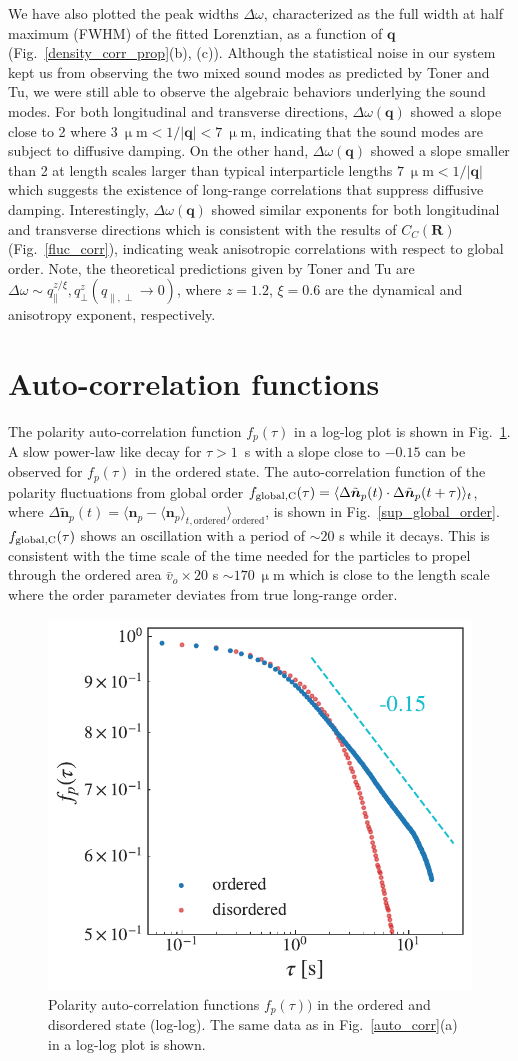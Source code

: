 \documentclass[%
 reprint,
 amsmath,amssymb,
 aps,
 floatfix
]{revtex4-2}
\begin{document}
We have also plotted the peak widths $\Delta\omega$, characterized as the full width at half maximum (FWHM) of the fitted Lorenztian, as a function of $\bm{q}$ (Fig.~\ref{density_corr_prop}(b), (c)).
Although the statistical noise in our system kept us from observing the two mixed sound modes as predicted by Toner and Tu, we were still able to observe the algebraic behaviors underlying the sound modes.
For both longitudinal and transverse directions, $\Delta\omega(\bm{q})$ showed a slope close to 2 where $3~\upmu\textrm{m}< 1/|\bm{q}| <7~\upmu\textrm{m}$, indicating that the sound modes are subject to diffusive damping.
On the other hand, $\Delta\omega(\bm{q})$ showed a slope smaller than 2 at length scales larger than typical interparticle lengths $7~\upmu\textrm{m}< 1/|\bm{q}|$ which suggests the existence of long-range correlations that suppress diffusive damping.
Interestingly, $\Delta\omega(\bm{q})$ showed similar exponents for both longitudinal and transverse directions which is consistent with the results of $C_C\left(\bm{R}\right)$ (Fig.~\ref{fluc_corr}), indicating weak anisotropic correlations with respect to global order.
Note, the theoretical predictions given by Toner and Tu are $\Delta\omega\sim q_{\parallel}^{z/\xi}, q_{\perp}^{z} (q_{\parallel,\perp}\rightarrow0)$, where $z=1.2$, $\xi=0.6$ are the dynamical and anisotropy exponent, respectively.


\section{Auto-correlation functions}
The polarity auto-correlation function $f_p(\tau)$ in a log-log plot is shown in Fig.~\ref{sup_autocorr}. 
A slow power-law like decay for $\tau > 1$~s with a slope close to $-0.15$ can be observed for $f_p(\tau)$ in the ordered state.
The auto-correlation function of the polarity fluctuations from global order 
$f_{\rm global,C}(\tau)=\langle\Delta\tilde{\bm{n}}_p(t)\cdot\Delta\tilde{\bm{n}}_p(t+\tau)\rangle_t$,
where
$\Delta \tilde{\bm{n}} _{p}(t) = \langle\bm{n}_p - \langle\bm{n}_p\rangle_{t,\textrm{ordered}}\rangle_{\textrm{ordered}}$,
is shown in Fig.~\ref{sup_global_order}.
$f_{\rm global,C}(\tau)$ shows an oscillation with a period of $\sim 20$ s while it decays. 
This is consistent with the time scale of the time needed for the particles to propel through the ordered area $\bar{v}_o \times 20$ s $\sim 170\ \upmu$m which is close to the length scale where the order parameter deviates from true long-range order.

\begin{figure}[hbt]
\includegraphics[width=0.3\columnwidth]{sup_autocorr.pdf}
\caption{\label{sup_autocorr} Polarity auto-correlation functions $f_p(\tau))$ in the ordered and disordered state (log-log). The same data as in Fig.~\ref{auto_corr}(a) in a log-log plot is shown.}
\end{figure}
\end{document}
